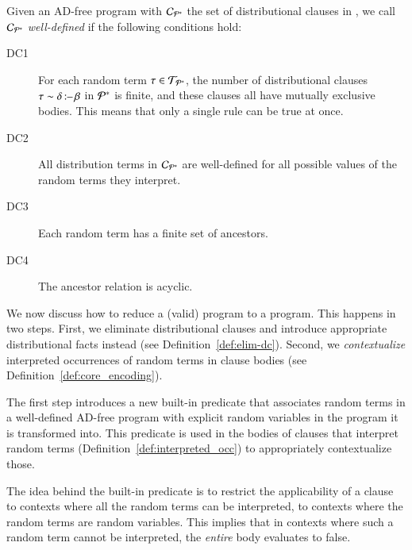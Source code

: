 \begin{definition}\label{def:dc-df-well-def}
	Given an AD-free program \adfreeprogram with $\mathcal{C}_{{\mathcal{P}}^{*}}$ the set of distributional clauses in \adfreeprogram, we call $\mathcal{C}_{{\mathcal{P}}^{*}}$ \emph{well-defined} if the following conditions hold:
	\begin{description}
		\item[DC1] For each random term $\tau \in \mathcal{T}_{{\mathcal{P}}^{*}}$,  the number of  distributional clauses $\tau \sim \delta \operatorname*{\mathtt{{:}{\---}}} \beta$ in ${{\mathcal{P}}^{*}}$ is finite, and these clauses all have mutually exclusive bodies. This means that only a single rule can be true at once.
		\item[DC2] All distribution terms in $\mathcal{C}_{{\mathcal{P}}^{*}}$ are well-defined for all possible values of the random terms they interpret.
		\item[DC3] Each random term has a finite set of ancestors.
		\item[DC4] The ancestor relation is acyclic.
	\end{description}
\end{definition}












We now discuss how to reduce a (valid) \dcproblogsty program to a \dfplpsty program. This happens in two steps. First, we eliminate distributional clauses and introduce appropriate distributional facts instead (see Definition~\ref{def:elim-dc}). Second, we {\em contextualize} interpreted occurrences of random terms in clause bodies (see Definition~\ref{def:core_encoding}).

The first step introduces a new built-in predicate  that associates random terms in a well-defined AD-free program with explicit random variables in the \dfplpsty program it is transformed into. This predicate is used in the bodies of clauses that interpret random terms (\cf Definition~\ref{def:interpreted_occ}) to appropriately contextualize those.

The idea behind the built-in  predicate is to restrict the applicability of a clause to contexts where all the random terms can be interpreted, \ie to contexts where the random terms are random variables. This implies that in contexts where such a random term cannot be interpreted, the \emph{entire} body evaluates to false.


